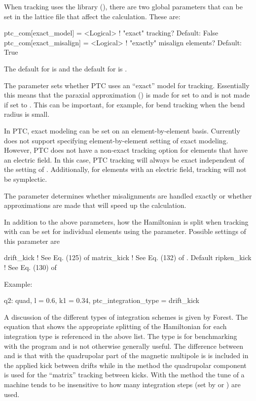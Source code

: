 When tracking uses the  library (), there are two global parameters that
can be set in the lattice file that affect the calculation. These are:
\begin{example}
  ptc_com[exact_model]    = <Logical>  ! "exact" tracking? Default: False
  ptc_com[exact_misalign] = <Logical>  ! "exactly" misalign elements? Default: True
\end{example}
The default for  is  and the default for  is .

The  parameter sets whether PTC uses an ``exact'' model for
tracking. Essentially this means that the paraxial approximation () is made
for  set to  and is not made if set to . This can be
important, for example, for bend tracking when the bend radius is small.

In PTC, exact modeling can be set on an element-by-element basis. Currently \bmad does not support
specifying element-by-element setting of exact modeling. However, PTC does not have a non-exact
tracking option for elements that have an electric field. In this case, PTC tracking will always be
exact independent of the setting of .  Additionally, for elements with an
electric field, tracking will not be symplectic.

The  parameter determines whether misalignments are handled exactly or
whether approximations are made that will speed up the calculation.

In addition to the above parameters, how the Hamiltonian is split when tracking with  can be
set for individual elements using the  parameter. Possible settings of this
parameter are
\begin{example}
  drift_kick    ! See Eq. (125) of \cite{b:geo.int}
  matrix_kick   ! See Eq. (132) of \cite{b:geo.int}. Default
  ripken_kick   ! See Eq. (130) of \cite{b:geo.int}
\end{example}
Example:
\begin{example}
  q2: quad, l = 0.6, k1 = 0.34, ptc_integration_type = drift_kick
\end{example}
A discussion of the different types of integration schemes is given by Forest\cite{b:geo.int}. The
equation that shows the appropriate splitting of the Hamiltonian for each integration type is
referenced in the above list. The  type is for benchmarking with the 
program and is not otherwise generally useful. The difference between  and
 is that with  the quadrupolar part of the magnetic multipole is is
included in the applied kick between drifts while in the  method the quadrupolar
component is used for the ``matrix'' tracking between kicks. With the  method the
tune of a machine tends to be insensitive to how many integration steps (set by  or
) are used.


